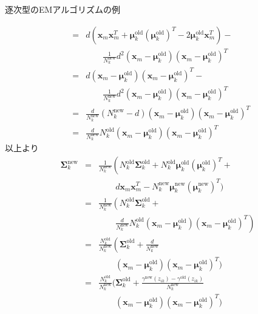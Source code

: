 \documentclass[dvipdfmx,notheorems,t]{beamer}
\begin{document}
\begin{frame}{逐次型のEMアルゴリズムの例}
\begin{itemize}
\begin{itemize}
\begin{eqnarray}
			&=& d \left( \bm{x}_m \bm{x}_m^T + \bm{\mu}_k^\mathrm{old} (\bm{\mu}_k^\mathrm{old})^T - 2 \bm{\mu}_k^\mathrm{old} \bm{x}_m^T \right) - \nonumber \\
			&& \qquad \frac{1}{N_k^\mathrm{new}} d^2 \left( \bm{x}_m - \bm{\mu}_k^\mathrm{old} \right) \left( \bm{x}_m - \bm{\mu}_k^\mathrm{old} \right)^T \nonumber \\
			&=& d (\bm{x}_m - \bm{\mu}_k^\mathrm{old}) (\bm{x}_m - \bm{\mu}_k^\mathrm{old})^T - \nonumber \\
			&& \qquad \frac{1}{N_k^\mathrm{new}} d^2 \left( \bm{x}_m - \bm{\mu}_k^\mathrm{old} \right) \left( \bm{x}_m - \bm{\mu}_k^\mathrm{old} \right)^T \nonumber \\
			&=& \frac{d}{N_k^\mathrm{new}} \left( N_k^\mathrm{new} - d \right) \left( \bm{x}_m - \bm{\mu}_k^\mathrm{old} \right) \left( \bm{x}_m - \bm{\mu}_k^\mathrm{old} \right)^T \nonumber \\
			&=& \frac{d}{N_k^\mathrm{new}} N_k^\mathrm{old} \left( \bm{x}_m - \bm{\mu}_k^\mathrm{old} \right) \left( \bm{x}_m - \bm{\mu}_k^\mathrm{old} \right)^T
		\end{eqnarray}
		以上より
		\begin{eqnarray}
			\bm{\Sigma}_k^\mathrm{new} &=& \frac{1}{N_k^\mathrm{new}} \left( N_k^\mathrm{old} \bm{\Sigma}_k^\mathrm{old} + N_k^\mathrm{old} \bm{\mu}_k^\mathrm{old} (\bm{\mu}_k^\mathrm{old})^T + \right. \nonumber \\
			&& \qquad d \bm{x}_m \bm{x}_m^T - N_k^\mathrm{new} \bm{\mu}_k^\mathrm{new} (\bm{\mu}_k^\mathrm{new})^T \Bigg) \nonumber \\
			&=& \frac{1}{N_k^\mathrm{new}} \left( N_k^\mathrm{old} \bm{\Sigma}_k^\mathrm{old} + \right. \nonumber \\
			&& \qquad \left. \frac{d}{N_k^\mathrm{new}} N_k^\mathrm{old} \left( \bm{x}_m - \bm{\mu}_k^\mathrm{old} \right) \left( \bm{x}_m - \bm{\mu}_k^\mathrm{old} \right)^T \right) \nonumber \\
			&=& \frac{N_k^\mathrm{old}}{N_k^\mathrm{new}} \left( \bm{\Sigma}_k^\mathrm{old} + \frac{d}{N_k^\mathrm{new}} \right. \nonumber \\
			&& \qquad \left( \bm{x}_m - \bm{\mu}_k^\mathrm{old} \right) \left( \bm{x}_m - \bm{\mu}_k^\mathrm{old} \right)^T \bigg) \nonumber \\
			&=& \frac{N_k^\mathrm{old}}{N_k^\mathrm{new}} \bigg( \bm{\Sigma}_k^\mathrm{old} + \frac{\gamma^\mathrm{new}(z_{ik}) - \gamma^\mathrm{old}(z_{ik})}{N_k^\mathrm{new}} \nonumber \\
			&& \qquad \left( \bm{x}_m - \bm{\mu}_k^\mathrm{old} \right) \left( \bm{x}_m - \bm{\mu}_k^\mathrm{old} \right)^T \bigg)
		\end{eqnarray}
		

\end{itemize}
\end{itemize}
\end{frame}
\end{document}
